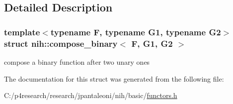 \subsection{\-Detailed \-Description}
\subsubsection*{template$<$typename F, typename G1, typename G2$>$struct nih\-::compose\-\_\-binary$<$ F, G1, G2 $>$}

compose a binary function after two unary ones 

\-The documentation for this struct was generated from the following file\-:\begin{DoxyCompactItemize}
\item 
\-C\-:/p4research/research/jpantaleoni/nih/basic/\hyperlink{functors_8h}{functors.\-h}\end{DoxyCompactItemize}
